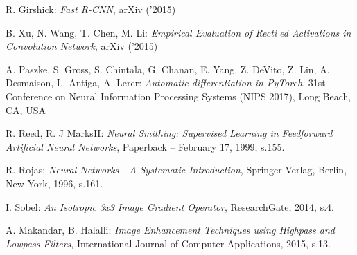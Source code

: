 \begin{thebibliography}{99}
   R. Girshick:
  \emph{Fast R-CNN},
  arXiv ('2015)

   B. Xu, N. Wang, T. Chen, M. Li:
  \emph{Empirical Evaluation of Rectied Activations in Convolution Network},
   arXiv ('2015)

    A. Paszke, S. Gross, S. Chintala, G. Chanan,
   E. Yang, Z. DeVito, Z. Lin, A. Desmaison, L. Antiga, A. Lerer:
   \emph{Automatic differentiation in PyTorch}, 31st Conference on Neural Information
   Processing Systems (NIPS 2017), Long Beach, CA, USA

    R. Reed,  R. J MarksII:
  \emph{Neural Smithing: Supervised Learning in Feedforward Artificial Neural Networks},
  Paperback – February 17, 1999, s.155.

   R. Rojas:
  \emph{Neural Networks - A Systematic Introduction},
  Springer-Verlag, Berlin, New-York, 1996, s.161.

   I. Sobel:
  \emph{An Isotropic 3x3 Image Gradient Operator},
  ResearchGate, 2014, s.4.

   A. Makandar, B. Halalli:
  \emph{Image Enhancement Techniques using Highpass and Lowpass Filters},
  International Journal of Computer Applications, 2015, s.13.

\end{thebibliography}
